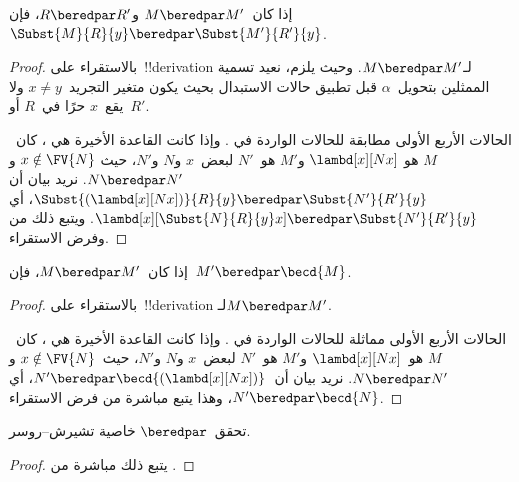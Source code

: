 \documentclass[../../../include/open-logic-section]{subfiles}
\begin{document}
\begin{lem}
  إذا كان~$M \beredpar M'$ و$R \beredpar R'$، فإن~$\Subst{M}{R}{y}
  \beredpar \Subst{M'}{R'}{y}$.
\end{lem}

\begin{proof}
  بالاستقراء على~!!{derivation} لـ$M \beredpar M'$. وحيث يلزم، نعيد
  تسمية الممثلين بتحويل~$\alpha$ قبل تطبيق حالات الاستبدال بحيث يكون
  متغير التجريد~$x \ne y$ ولا يقع~$x$ حرًا في~$R$ أو~$R'$.

  الحالات الأربع الأولى مطابقة للحالات الواردة في .
  وإذا كانت القاعدة الأخيرة هي ، كان~$M$ هو
  $\lambd[x][Nx]$ و$M'$ هو~$N'$ لبعض~$x$ و$N$ و$N'$، حيث
  $x \notin \FV{N}$ و$N \beredpar N'$. نريد بيان أن
  $\Subst{(\lambd[x][Nx])}{R}{y} \beredpar \Subst{N'}{R'}{y}$، أي
  $\lambd[x][\Subst{N}{R}{y} x] \beredpar \Subst{N'}{R'}{y}$.
  ويتبع ذلك من  وفرض
  الاستقراء.
\end{proof}

\begin{lem}
  إذا كان~$M \beredpar M'$، فإن~$M' \beredpar \becd{M}$.
\end{lem}

\begin{proof}
  بالاستقراء على~!!{derivation} لـ$M \beredpar M'$.

  الحالات الأربع الأولى مماثلة للحالات الواردة في
  . وإذا كانت القاعدة الأخيرة هي
  ، كان~$M$ هو~$\lambd[x][Nx]$ و$M'$ هو~$N'$
  لبعض~$x$ و$N$ و$N'$، حيث~$x \notin \FV{N}$ و$N \beredpar N'$.
  نريد بيان أن~$N' \beredpar \becd{(\lambd[x][Nx])}$، أي
  $N' \beredpar \becd{N}$، وهذا يتبع مباشرة من فرض الاستقراء.
\end{proof}

\begin{thm}
  تحقق~$\beredpar$ خاصية تشيرش--روسر.
\end{thm}

\begin{proof}
  يتبع ذلك مباشرة من .
\end{proof}
\end{document}

